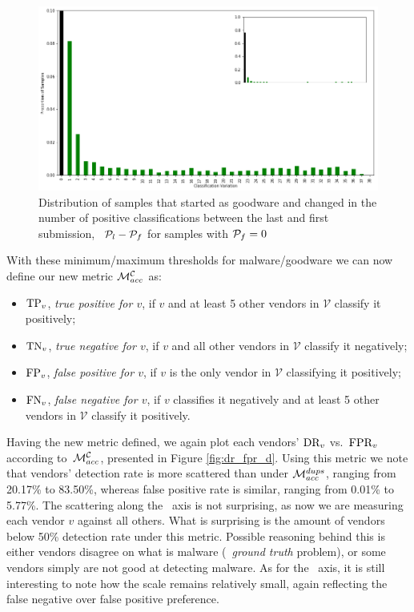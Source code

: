 \begin{figure}[!htb]
	\centering
	\includegraphics[width=\textwidth]{Figures/distribution_clean.png}
	\caption[Distribution of duplicated samples with $\Pf=0$.]{Distribution of samples that started as goodware and changed in the number of positive classifications between the last and first submission, \ie\ $\mathcal{P}_{l}-\mathcal{P}_{f}$ for samples with $\Pf=0$}
	\label{fig:distribution_clean}
\end{figure}

With these minimum/maximum thresholds for malware/goodware we can now define our new metric $\mathcal{M}_{acc}^{\mathcal{C}}$ as:

\begin{itemize}
	\item $\textrm{TP}_v$, \emph{true positive for $v$}, if $v$ and at least 5 other vendors in $\mathcal{V}$ classify it positively;
	\item $\textrm{TN}_v$, \emph{true negative for $v$}, if $v$ and all other vendors in $\mathcal{V}$ classify it negatively;
	\item $\textrm{FP}_v$, \emph{false positive for $v$}, if $v$ is the only vendor in $\mathcal{V}$ classifying it positively;
	\item $\textrm{FN}_v$, \emph{false negative for $v$}, if $v$ classifies it negatively and at least 5 other vendors in $\mathcal{V}$ classify it positively.
\end{itemize}

Having the new metric defined, we again plot each vendors' $\textrm{DR}_v$ vs.\ $\textrm{FPR}_v$ according to~$\mathcal{M}_{acc}^{\mathcal{C}}$, presented in Figure \ref{fig:dr_fpr_d}.
Using this metric we note that vendors' detection rate is more scattered than under $\mathcal{M}_{acc}^{{dups}}$, ranging from 20.17\% to 83.50\%, whereas false positive rate is similar, ranging from 0.01\% to 5.77\%.
The scattering along the \tpr\ axis is not surprising, as now we are measuring each vendor $v$ against all others.
What is surprising is the amount of vendors below 50\% detection rate under this metric.
Possible reasoning behind this is either vendors disagree on what is malware (\ie\ \textit{ground truth} problem), or some vendors simply are not good at detecting malware.
As for the \fpr\ axis, it is still interesting to note how the scale remains relatively small, again reflecting the false negative over false positive preference.

